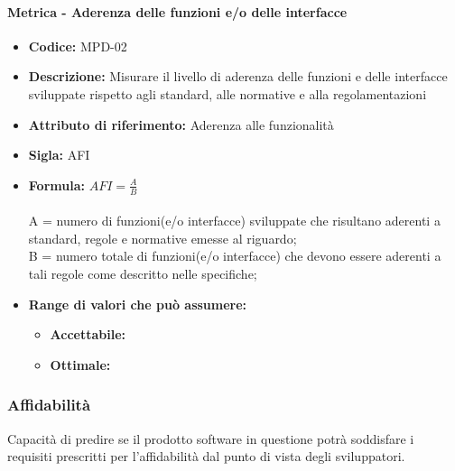               \paragraph{Metrica - Aderenza delle funzioni e/o delle interfacce} 
              \begin{itemize}
          \item  \textbf{Codice:} MPD-02
        \item    \textbf{Descrizione:} Misurare il livello di aderenza delle funzioni e delle interfacce sviluppate rispetto agli standard, alle normative e alla regolamentazioni
          \item  \textbf{Attributo di riferimento:} Aderenza alle funzionalità 
        \item    \textbf{Sigla:} AFI
         \item   \textbf{Formula:} \begin{math}AFI = \frac{A}{B}\end{math}\\ \\
              A = numero di funzioni(e/o interfacce) sviluppate che risultano aderenti a standard, regole e normative emesse al riguardo; \\
              B = numero totale di funzioni(e/o interfacce) che devono essere aderenti a tali regole come descritto nelle specifiche;
                   \item \textbf{Range di valori che può assumere:}
        \begin{itemize}
            \item \textbf{Accettabile:} 
            \item \textbf{Ottimale:} 
        \end{itemize}
       \end{itemize}
              
  \subsubsection{Affidabilità} 
  Capacità di predire se il prodotto software in questione potrà soddisfare i requisiti prescritti per l'affidabilità dal punto di vista degli sviluppatori.\
